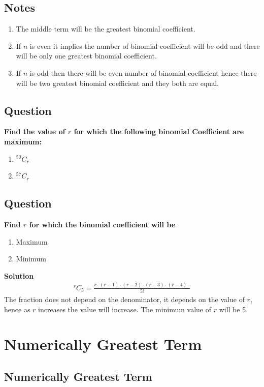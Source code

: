 \documentclass[12pt]{article}
\begin{document}
\subsection*{Notes}
\begin{enumerate}
    \item The middle term will be the greatest binomial coefficient.
    \item If $n$ is even it implies the number of binomial coefficient will be odd and there will be only one greatest binomial coefficient.
    \item If $n$ is odd then there will be even number of binomial coefficient hence there will be two greatest binomial coefficient and they both are equal.
\end{enumerate}
\subsection*{Question}
\textbf{Find the value of $r$ for which the following binomial Coefficient are maximum: }
\begin{enumerate}[label=\Roman*.]
    \item ${}^{50}C_{r}$
    \item ${}^{57}C_{r}$
\end{enumerate}

\subsection*{Question}
\textbf{Find $r$ for which the binomial coefficient will be}
\begin{enumerate}
    \item Maximum
    \item Minimum
\end{enumerate}
\textbf{Solution} \\
\[
\begin{aligned}
    {}^{r}C_{5} = \frac{r\cdot(r-1)\cdot(r-2)\cdot(r-3)\cdot(r-4)\cdot}{5!}
\end{aligned}
\]
The fraction does not depend on the denominator, it depends on the value of $r$, hence as $r$ increases the value will increase. The minimum value of $r$ will be 5.

\section{Numerically Greatest Term}
\subsection{Numerically Greatest Term}
\end{document}

